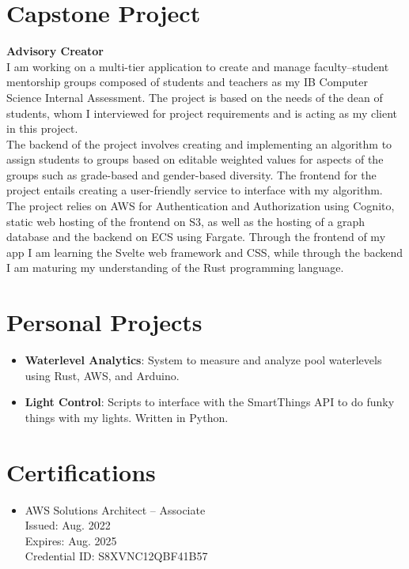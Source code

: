 \documentclass[letterpaper,11pt]{article}
\newcommand{\resumeItem}[2]{
    \item\small{
        \textbf{#1}{: #2 \vspace{-3pt}}
    }
}
\newcommand{\resumeSubItem}[2]{\resumeItem{#1}{#2}\vspace{-4pt}}
\newcommand{\resumeSubHeadingListStart}{\begin{itemize}[leftmargin=*]}
\newcommand{\resumeSubHeadingListEnd}{\end{itemize}}
\begin{document}
\section{Capstone Project}
    \textbf{Advisory Creator}\\
    I am working on a multi-tier application to create and manage faculty--student mentorship groups composed of students and teachers as my IB Computer Science Internal Assessment.
    The project is based on the needs of the dean of students, whom I interviewed for project requirements and is acting as my client in this project.\\
    \vspace{0.15cm}
    The backend of the project involves creating and implementing an algorithm to assign students to groups based on editable weighted values for aspects of the groups such as grade-based and gender-based diversity.
    The frontend for the project entails creating a user-friendly service to interface with my algorithm.\\
    \vspace{0.15cm}
    The project relies on AWS for Authentication and Authorization using Cognito, static web hosting of the frontend on S3, as well as the hosting of a graph database and the backend on ECS using Fargate.
    Through the frontend of my app I am learning the Svelte web framework and CSS, while through the backend I am maturing my understanding of the Rust programming language.\\

\section{Personal Projects}
    \resumeSubHeadingListStart
        \resumeSubItem{Waterlevel Analytics}
            {System to measure and analyze pool waterlevels using Rust, AWS, and Arduino.}
        \resumeSubItem{Light Control}
            {Scripts to interface with the SmartThings API to do funky things with my lights. Written in Python.}
    \resumeSubHeadingListEnd


    \section{Certifications}
    \resumeSubHeadingListStart
        \item{
            AWS Solutions Architect -- Associate\\
            \hspace{.3cm}\small Issued: Aug. 2022\\
            \hspace{.3cm}\small Expires: Aug. 2025\\
            \hspace{.3cm}\small Credential ID: S8XVNC12QBF41B57\\
        }
    \resumeSubHeadingListEnd
\end{document}
